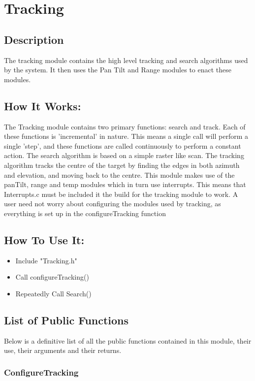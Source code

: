 \documentclass[]{report}
\begin{document}
\chapter{Tracking}
\section{Description}
The tracking module contains the high level tracking and search algorithms used by the system. It then uses the Pan Tilt and Range modules to enact these modules.

\section{How It Works:}
The Tracking module contains two primary functions: search and track. Each of these functions is 'incremental' in nature. This means a single call will perform a single 'step', and these functions are called continuously to perform a constant action. \newline
The search algorithm is based on a simple raster like scan. The tracking algorithm tracks the centre of the target by finding the edges in both azimuth and elevation, and moving back to the centre. \newline
This module makes use of the panTilt, range and temp modules which in turn use interrupts. This means that Interrupts.c must be included it the build for the tracking module to work. A user need not worry about configuring the modules used by tracking, as everything is set up in the configureTracking function

\section{How To Use It:}
\begin{itemize}
	\item Include "Tracking.h"
	\item Call configureTracking()
	\item Repeatedly Call Search()
\end{itemize}

\section{List of Public Functions}
Below is a definitive list of all the public functions contained in this module, their use, their arguments and their returns.

\subsection{ConfigureTracking}
\end{document}
